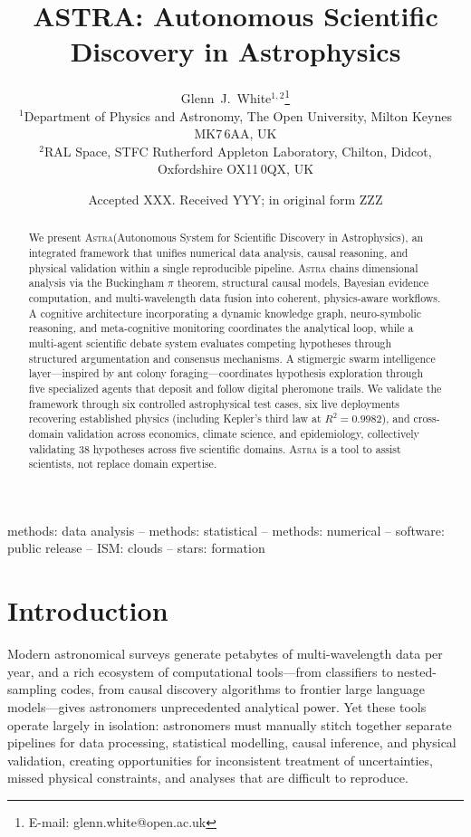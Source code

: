 \documentclass[usenatbib]{rasti}
\title[ASTRA: Autonomous Scientific Discovery]{ASTRA: Autonomous Scientific Discovery in Astrophysics}
\author[White]{
Glenn~J.~White$^{1,2}$\thanks{E-mail: glenn.white@open.ac.uk}\\
$^{1}$Department of Physics and Astronomy, The Open University, Milton Keynes MK7\,6AA, UK\\
$^{2}$RAL Space, STFC Rutherford Appleton Laboratory, Chilton, Didcot, Oxfordshire OX11\,0QX, UK
}
\date{Accepted XXX. Received YYY; in original form ZZZ}
\newcommand{\astra}{\textsc{Astra}\xspace}
\begin{document}
\maketitle

\begin{abstract}
We present \astra (Autonomous System for Scientific Discovery in Astrophysics), an integrated framework that unifies numerical data analysis, causal reasoning, and physical validation within a single reproducible pipeline.
\astra chains dimensional analysis via the Buckingham $\pi$ theorem, structural causal models, Bayesian evidence computation, and multi-wavelength data fusion into coherent, physics-aware workflows.
A cognitive architecture incorporating a dynamic knowledge graph, neuro-symbolic reasoning, and meta-cognitive monitoring coordinates the analytical loop, while a multi-agent scientific debate system evaluates competing hypotheses through structured argumentation and consensus mechanisms.
A stigmergic swarm intelligence layer---inspired by ant colony foraging---coordinates hypothesis exploration through five specialized agents that deposit and follow digital pheromone trails.
We validate the framework through six controlled astrophysical test cases, six live deployments recovering established physics (including Kepler's third law at $R^{2}=0.9982$), and cross-domain validation across economics, climate science, and epidemiology, collectively validating 38 hypotheses across five scientific domains.
\astra is a tool to assist scientists, not replace domain expertise.
\end{abstract}

\begin{keywords}
methods: data analysis -- methods: statistical -- methods: numerical -- software: public release -- ISM: clouds -- stars: formation
\end{keywords}

\section{Introduction}
\label{sec:introduction}

Modern astronomical surveys generate petabytes of multi-wavelength data per year, and a rich ecosystem of computational tools---from classifiers to nested-sampling codes, from causal discovery algorithms \citep{Spirtes2000} to frontier large language models---gives astronomers unprecedented analytical power.
Yet these tools operate largely in isolation: astronomers must manually stitch together separate pipelines for data processing, statistical modelling, causal inference, and physical validation, creating opportunities for inconsistent treatment of uncertainties, missed physical constraints, and analyses that are difficult to reproduce.
\end{document}
